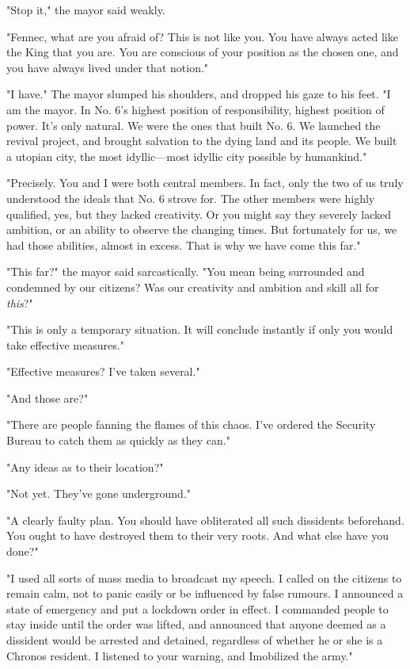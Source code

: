 "\el Stop it," the mayor said weakly.

"Fennec, what are you afraid of? This is not like you. You have always
acted like the King that you are. You are conscious of your position as
the chosen one, and you have always lived under that notion."

"I have." The mayor slumped his shoulders, and dropped his gaze to his
feet. "I am the mayor. In No. 6's highest position of responsibility,
highest position of power. It's only natural. We were the ones that
built No. 6. We launched the revival project, and brought salvation to
the dying land and its people. We built a utopian city, the most
idyllic---most idyllic city possible by humankind."

"Precisely. You and I were both central members. In fact, only the two
of us truly understood the ideals that No. 6 strove for. The other
members were highly qualified, yes, but they lacked creativity. Or you
might say they severely lacked ambition, or an ability to observe the
changing times. But fortunately for us, we had those abilities, almost
in excess. That is why we have come this far."

"This far?" the mayor said sarcastically. "You mean being surrounded and
condemned by our citizens? Was our creativity and ambition and skill all
for \emph{this}?"

"This is only a temporary situation. It will conclude instantly if only
you would take effective measures."

"Effective measures? I've taken several."

"And those are?"

"There are people fanning the flames of this chaos. I've ordered the
Security Bureau to catch them as quickly as they can."

"Any ideas as to their location?"

"Not yet. They've gone underground."

"A clearly faulty plan. You should have obliterated all such dissidents
beforehand. You ought to have destroyed them to their very roots. And
what else have you done?"

"I used all sorts of mass media to broadcast my speech. I called on the
citizens to remain calm, not to panic easily or be influenced by false
rumours. I announced a state of emergency and put a lockdown order in
effect. I commanded people to stay inside until the order was lifted,
and announced that anyone deemed as a dissident would be arrested and
detained, regardless of whether he or she is a Chronos resident. I
listened to your warning, and I\el mobilized the army."

